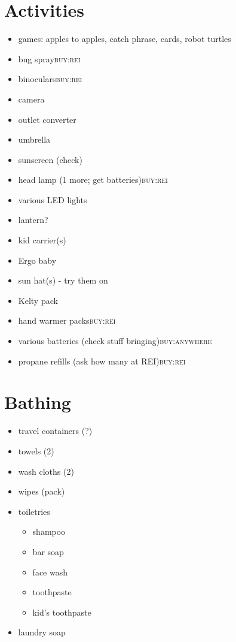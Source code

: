 \documentclass[11pt]{article}
\begin{document}
\section*{Activities}
\label{sec-5}
\begin{itemize}
\item games: apples to apples, catch phrase, cards, robot turtles
\label{sec-5-1}
\item bug spray\hfill{}\textsc{buy:rei}
\label{sec-5-2}
\item binoculars\hfill{}\textsc{buy:rei}
\label{sec-5-3}
\item camera
\label{sec-5-4}
\item outlet converter
\label{sec-5-5}
\item umbrella
\label{sec-5-6}
\item sunscreen (check)
\label{sec-5-7}
\item head lamp (1 more; get batteries)\hfill{}\textsc{buy:rei}
\label{sec-5-8}
\item various LED lights
\label{sec-5-9}
\item lantern?
\label{sec-5-10}
\item kid carrier(s)
\label{sec-5-11}
\item Ergo baby
\label{sec-5-12}
\item sun hat(s) - try them on
\label{sec-5-13}
\item Kelty pack
\label{sec-5-14}
\item hand warmer packs\hfill{}\textsc{buy:rei}
\label{sec-5-15}
\item various batteries (check stuff bringing)\hfill{}\textsc{buy:anywhere}
\label{sec-5-16}
\item propane refills (ask how many at REI)\hfill{}\textsc{buy:rei}
\label{sec-5-17}
\end{itemize}

\section*{Bathing}
\label{sec-6}
\begin{itemize}
\item travel containers (?)
\label{sec-6-1}
\item towels (2)
\label{sec-6-2}
\item wash cloths (2)
\label{sec-6-3}
\item wipes (pack)
\label{sec-6-4}
\item\relax [0/6] toiletries
\label{sec-6-5}
\begin{itemize}
\item shampoo
\label{sec-6-5-1}
\item bar soap
\label{sec-6-5-2}
\item face wash
\label{sec-6-5-3}
\item toothpaste
\label{sec-6-5-4}
\item kid's toothpaste
\label{sec-6-5-5}
\end{itemize}
\item laundry soap
\label{sec-6-6}
\end{itemize}
\end{document}

